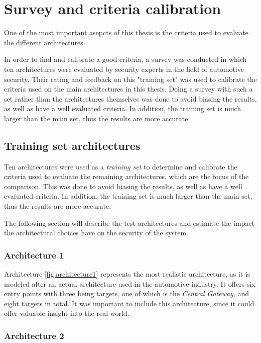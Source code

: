 \chapter{Survey and criteria calibration}
\label{chp:introcriteria}

One of the most important asepcts of this thesis is the criteria used to evaluate the different architectures.

In order to find and calibrate a good criteria, a survey was conducted in which ten architectures were evaluated by security experts in the field of automotive security.
Their rating and feedback on this "training set" was used to calibrate the criteria used on the main architectures in this thesis.
Doing a survey with such a set rather than the architectures themselves was done to avoid biasing the results, as well as have a well evaluated criteria.
In addition, the training set is much larger than the main set, thus the results are more accurate.

\section{Training set architectures}
\label{sec:trainingarch}

Ten architectures were used as a \textit{training set} to determine and calibrate the criteria used to 
evaluate the remaining architectures, which are the focus of the comparison.
This was done to avoid biasing the results, as well as have a well evaluated criteria.
In addition, the training set is much larger than the main set, thus the results are more accurate.

The following section will describe the test architectures and estimate the impact the architectural choices have on the security of the system.

\subsection{Architecture 1}
\label{subsec:arch1}

Architecture \ref{fig:architecture1} represents the most realistic architecture, 
as it is modeled after an actual architecture used in the automotive industry. 
It offers six entry points with three being targets, one of which is the \textit{Central Gateway}, and eight targets in total. 
It was important to include this architecture, since it could offer valuable insight into the real world.

\subsection{Architecture 2}
\label{subsec:arch2}

